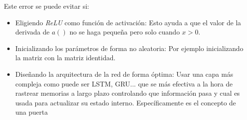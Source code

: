 \begin{itemize}
    Este error se puede evitar si:
    \begin{itemize}
        \item Eligiendo \textit{ReLU} como función de activación: Esto ayuda a que el valor de la derivada de $a()$ no se haga pequeña pero solo cuando $x>0$.
        \item Inicializando los parámetros de forma no aleatoria: Por ejemplo inicializando la matriz con la matriz identidad.
        \item Diseñando la arquitectura de la red de forma óptima: Usar una capa más compleja como puede ser LSTM, GRU... que se más efectiva a la hora de rastrear memorias a largo plazo controlando que información pasa y cual es usada para actualizar su estado interno. Específicamente es el concepto de una puerta 
    \end{itemize}
\end{itemize}